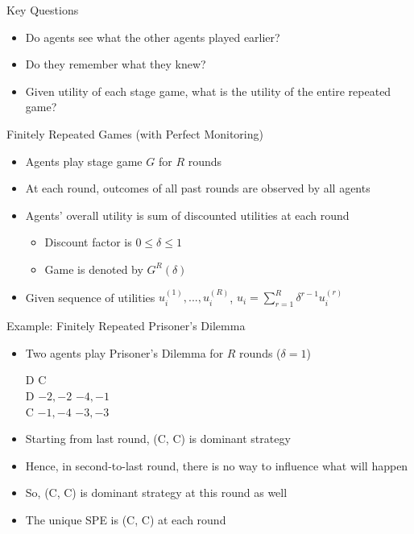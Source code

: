 \documentclass[11pt,aspectratio=169]{beamer}
\begin{document}
  \begin{frame}{Key Questions}
   \begin{itemize}
   \setlength{\itemsep}{1.2em}
    \item Do agents see what the other agents played earlier?
    \item Do they remember what they knew?
    \item Given utility of each stage game, what is the utility of the entire repeated game?
   \end{itemize}
  \end{frame}
  
  
  \begin{frame}{Finitely Repeated Games (with Perfect Monitoring)}
   \begin{itemize}[<+->]
   \setlength{\itemsep}{1.2em}
    \item Agents play stage game $G$ for $R$ rounds
    \item At each round, outcomes of all past rounds are observed by all agents
    \item Agents' overall utility is sum of \alert{discounted utilities} at each round
    \begin{itemize}[<.->]
     \item Discount factor is $ 0 \le \delta \le 1$
     \item Game is denoted by $G^{R}(\delta)$
    \end{itemize}
    \item Given sequence of utilities $u_i^{(1)}, ..., u_i^{(R)}$, $u_i = \sum_{r=1}^{R}\delta^{r-1} u_i^{(r)}$
   \end{itemize}
  \end{frame}
 
 
  \begin{frame}{Example: Finitely Repeated Prisoner's Dilemma}
   \begin{itemize}[<+->]
    \item Two agents play Prisoner's Dilemma for $R$ rounds ($\delta = 1$)
    \begin{center}
     \hspace{-3.5em}
     \begin{game}{2}{2}
      		\> D			\> C			\\
      D		\> $-2,-2$	\> $-4,-1$	\\
      C		\> $-1,-4$	\> $-3,-3$
     \end{game}
    \end{center}
    \vspace{0.7em}  
    \item Starting from last round, (C, C) is dominant strategy
    \item Hence, in second-to-last round, there is no way to influence what will happen
    \item So, (C, C) is dominant strategy at this round as well
    \item The unique SPE is (C, C) at each round
   \end{itemize}
  \end{frame}
  
\end{document}
